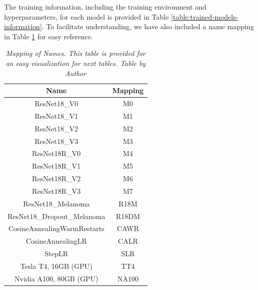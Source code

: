 The training information, including the training environment and hyperparameters, for each model is provided in Table \ref{table:trained-models-information}. To facilitate understanding, we have also included a name mapping in Table \ref{table:mapping-names} for easy reference.

\begin{table}[H]
\centering
\begin{tabular}{cc}
    \toprule
\textbf{Name} & \textbf{Mapping} \\  \midrule
ResNet18\_V0 & M0 \\
ResNet18\_V1 & M1 \\
ResNet18\_V2 & M2 \\
ResNet18\_V3 & M3 \\
ResNet18R\_V0  & M4 \\
ResNet18R\_V1  & M5 \\
ResNet18R\_V2 & M6 \\
ResNet18R\_V3  & M7 \\
ResNet18\_Melanoma & R18M \\
ResNet18\_Dropout\_Melanoma & R18DM \\
CosineAnnealingWarmRestarts & CAWR \\
CosineAnnealingLR & CALR \\
StepLR & SLR \\
Tesla T4, 16GB (GPU) & TT4 \\
Nvidia A100, 80GB (GPU) & NA100 \\ \bottomrule
\end{tabular}
\caption[Mapping of Names.]
  {\textit{Mapping of Names. This table is provided for an easy visualization for next tables.
  Table by Author}}
{\label{table:mapping-names}}
\end{table}

\newpage

